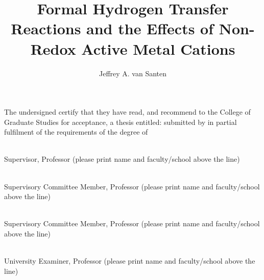 \documentclass[msc,oneside]{ubcthesis}%
\title{Formal Hydrogen Transfer Reactions and the Effects of Non-Redox
  Active Metal Cations}
\author{Jeffrey A. van Santen} %
\begin{document}
\frontmatter                    %

\maketitle                      %

\makeatletter

The undersigned certify that they have read, and recommend to the College of
Graduate Studies for acceptance, a thesis entitled: {\sc \@title } submitted by
{\sc \@author} in partial fulfilment of the requirements of the degree of
\@degreetitle \makeatother

\newlength{\linespace}
\setlength{\linespace}{.75cm} %
\vspace{\linespace}\smaller

\noindent\underline{\hspace{30em}} \\
Supervisor, Professor (please print name and faculty/school above the line)

\vspace{\linespace}

\noindent\underline{\hspace{30em}} \\
Supervisory Committee Member, Professor (please print name and faculty/school above the line)

\vspace{\linespace}

\noindent\underline{\hspace{30em}} \\
Supervisory Committee Member, Professor (please print name and faculty/school above the line)

\vspace{\linespace}

\noindent\underline{\hspace{30em}} \\
University Examiner, Professor (please print name and faculty/school above the line)
\end{document}
